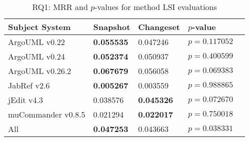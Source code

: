 
\begin{table}[t]
\renewcommand{\arraystretch}{1.3}
\footnotesize
\centering
\caption{RQ1: MRR and $p$-values for method LSI evaluations}
\begin{tabular}{l|ll|ll}
   \toprule
    Subject System & Snapshot & Changeset & $p$-value  \\
    \midrule

ArgoUML v0.22 & {\bf 0.055535 } & 0.047246 & $p = 0.117052$ \\
ArgoUML v0.24 & {\bf 0.052374 } & 0.050937 & $p = 0.400599$ \\
ArgoUML v0.26.2 & {\bf 0.067679 } & 0.056058 & $p = 0.069383$ \\
JabRef v2.6 & {\bf 0.005267 } & 0.003559 & $p = 0.988865$ \\
jEdit v4.3 & 0.038576 & {\bf 0.045326 } & $p = 0.072670$ \\
muCommander v0.8.5 & 0.021294 & {\bf 0.022017 } & $p = 0.750018$ \\
\midrule
All & {\bf 0.047253 } & 0.043663 & $p = 0.038331$ \\

    \bottomrule
\end{tabular}
\label{table:rq1:method:lsi}
\end{table}

